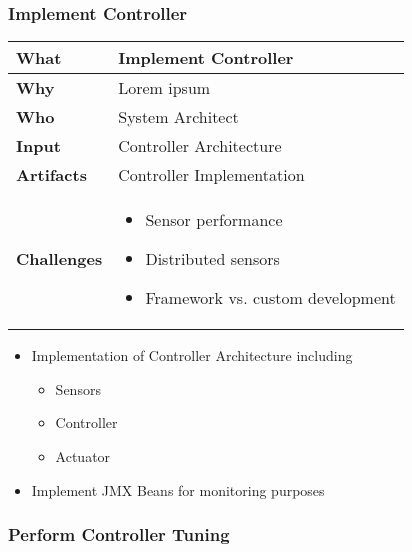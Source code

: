 \subsubsection{Implement Controller}
\begin{minipage}{\textwidth}
 \label{table:ch6_Task_Implement_Controller}
\begin{tabular}
	{|m{3cm}|m{10cm}|} \hline \bfseries What & Implement Controller\\
	\hline \bfseries Why & Lorem ipsum\\
	\hline \bfseries Who & System Architect\\
	\hline \bfseries Input & Controller Architecture\\
	\hline \bfseries Artifacts & Controller Implementation\\
	\hline \bfseries Challenges & 
		\begin{itemize}
			\item Sensor performance
			\item Distributed sensors 
			\item Framework vs. custom development
		\end{itemize}\\
	\hline 
\end{tabular}
\end{minipage}

\begin{itemize}
	\item Implementation of Controller Architecture including
	\begin{itemize}
		\item Sensors
		\item Controller
		\item Actuator
	\end{itemize}
	\item Implement JMX Beans for monitoring purposes
\end{itemize}

\subsubsection{Perform Controller Tuning}
